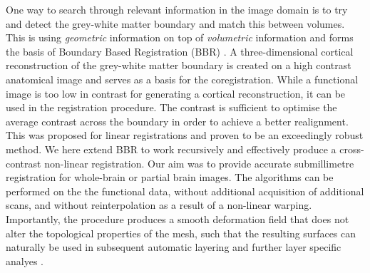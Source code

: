 One way to search through relevant information in the image domain is to try and detect the grey-white matter boundary and match this between volumes. This is using \emph{geometric} information on top of \emph{volumetric} information and forms the basis of Boundary Based Registration (BBR) \citep{Greve2009}. A three-dimensional cortical reconstruction of the grey-white matter boundary is created on a high contrast anatomical image and serves as a basis for the coregistration. While a functional image is too low in contrast for generating a cortical reconstruction, it can be used in the registration procedure. The contrast is sufficient to optimise the average contrast across the boundary in order to achieve a better realignment. This was proposed for linear registrations and proven to be an exceedingly robust method. We here extend BBR to work recursively and effectively produce a cross-contrast non-linear registration. Our aim was to provide accurate submillimetre registration for whole-brain or partial brain images. The algorithms can be performed on the the functional data, without additional acquisition of additional scans, and without reinterpolation as a result of a non-linear warping. Importantly, the procedure produces a smooth deformation field that does not alter the topological properties of the mesh, such that the resulting surfaces can naturally be used in subsequent automatic layering and further layer specific analyes \citep{Waehnert2014,Leprince2015}.
